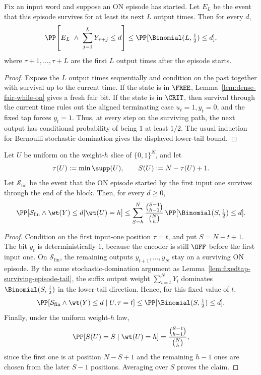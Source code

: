 \begin{lemma}
\label{lem:fixedtap-surviving-episode-tail}
Fix an input word and suppose an ON episode has started. Let \(E_L\) be the event that this episode survives for at
least its next \(L\) output times. Then for every \(d\),
\[
\PP\!\left[
E_L\ \wedge\ \sum_{j=1}^L Y_{\tau+j}\le d
\right]
\le
\PP[\Binomial(L,\tfrac12)\le d],
\]
where \(\tau+1,\dots,\tau+L\) are the first \(L\) output times after the episode starts.
\end{lemma}

\begin{proof}
Expose the \(L\) output times sequentially and condition on the past together with survival up to the current time.
If the state is in \(\FREE\), Lemma~\ref{lem:dense-fair-while-on} gives a fresh fair bit. If the state is in
\(\CRIT\), then survival through the current time rules out the aligned terminating case \(u_t=1,y_t=0\), and the
fixed tap forces \(y_t=1\). Thus, at every step on the surviving path, the next output has conditional probability of
being \(1\) at least \(1/2\). The usual induction for Bernoulli stochastic domination gives the displayed lower-tail
bound.
\end{proof}

\begin{lemma}
\label{lem:fixedtap-final-survivor-suffix}
Let \(U\) be uniform on the weight-\(h\) slice of \(\{0,1\}^N\), and let
\[
\tau(U):=\min\supp(U),\qquad S(U):=N-\tau(U)+1.
\]
Let \(\mathcal{S}_{\mathrm{fin}}\) be the event that the ON episode started by the first input one survives through the
end of the block. Then, for every \(d\ge 0\),
\[
\PP\!\left[
\mathcal{S}_{\mathrm{fin}}\wedge \wt(Y)\le d
\middle| \wt(U)=h
\right]
\le
\sum_{S=h}^{N}
\frac{\binom{S-1}{h-1}}{\binom{N}{h}}\,
\PP[\Binomial(S,\tfrac12)\le d].
\]
\end{lemma}

\begin{proof}
Condition on the first input-one position \(\tau=t\), and put \(S=N-t+1\). The bit \(y_t\) is deterministically \(1\),
because the encoder is still \(\OFF\) before the first input one. On \(\mathcal{S}_{\mathrm{fin}}\), the remaining
outputs \(y_{t+1},\dots,y_N\) stay on a surviving ON episode. By the same stochastic-domination argument as
Lemma~\ref{lem:fixedtap-surviving-episode-tail}, the suffix output weight
\(\sum_{i=t}^{N}Y_i\) dominates \(\Binomial(S,\tfrac12)\) in the lower-tail direction. Hence, for this fixed value of
\(t\),
\[
\PP[\mathcal{S}_{\mathrm{fin}}\wedge \wt(Y)\le d\mid U,\tau=t]
\le
\PP[\Binomial(S,\tfrac12)\le d].
\]
Finally, under the uniform weight-\(h\) law,
\[
\PP[S(U)=S\mid \wt(U)=h]
=
\frac{\binom{S-1}{h-1}}{\binom{N}{h}},
\]
since the first one is at position \(N-S+1\) and the remaining \(h-1\) ones are chosen from the later \(S-1\) positions.
Averaging over \(S\) proves the claim.
\end{proof}


